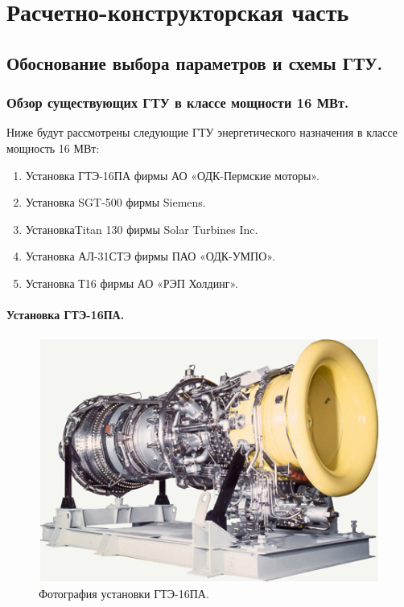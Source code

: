 \documentclass[a4paper,12pt]{article}
\begin{document}
    \section{Расчетно-конструкторская часть}

    \subsection{Обоснование выбора параметров и схемы ГТУ.}

    \subsubsection{Обзор существующих ГТУ в классе мощности 16 МВт.}

     Ниже будут рассмотрены следующие ГТУ энергетического назначения в классе мощность 16 МВт:
    \begin{enumerate}
        \item Установка ГТЭ-16ПА фирмы АО «ОДК-Пермские моторы».
        \item Установка SGT-500 фирмы Siemens.
        \item УстановкаTitan 130 фирмы Solar Turbines Inc.
        \item Установка АЛ-31СТЭ фирмы ПАО «ОДК-УМПО».
        \item Установка Т16 фирмы АО «РЭП Холдинг».
    \end{enumerate}

    \paragraph{Установка ГТЭ-16ПА.}

    \begin{figure}[h!]
        \centering
        \includegraphics[scale=1]{./pictures/GTE-16PA.png}
        \caption{Фотография установки ГТЭ-16ПА.}
        \label{pic_gte_16pa}
    \end{figure}
\end{document}
